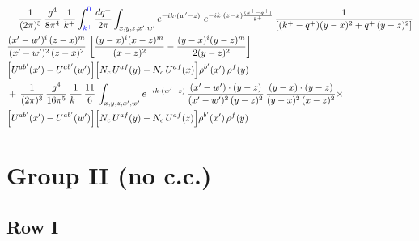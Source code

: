 \documentclass[10pt]{article}
\numberwithin{equation}{section}
\newcommand{\new}[1]{{\color{blue}#1}}
\begin{document}
\begin{align}
& - \frac{1}{(2\pi)^{3}}\,\frac{g^{4}}{8\pi^{4}}\,\frac{1}{k^{+}}\int_{\new{k^{+}}}^{\new{0}}\frac{dq^{+}}{2\pi}\int_{x,y,z,x',w'}e^{-ik\cdot(w'-z)}\ e^{-ik\cdot(z-x)\frac{(k^{+}-q^{+})}{k^{+}}}\,\frac{1}{\left[(k^{+}-q^{+})(y-x)^{2}+q^{+}\,(y-z)^{2}\right]}\notag \\ & \frac{(x'-w')^{i}\,(z-x)^{m}}{(x'-w')^{2}\,(z-x)^{2}}\,\left[\frac{(y-x)^{i}(x-z)^{m}}{(x-z)^{2}}-\frac{(y-x)^{i}(y-z)^{m}}{2(y-z)^{2}}\right]\notag \\ & \Big[U^{ab'}(x')-U^{ab'}(w')\Big]\Big[N_{c}\,U^{af}(y)-N_{c}\,U^{af}(x)\Big]\rho^{b'}(x')\,\rho^{f}(y) \notag \\
& +\, \frac{1}{(2\pi)^{3}}\,\frac{g^{4}}{16\pi^{5}}\,\frac{1}{k^{+}}\,\frac{11}{6}\,\int_{x,y,z,x',w'}e^{-ik\cdot(w'-z)}\, \frac{(x'-w')\cdot(y-z)}{(x'-w')^{2}\,(y-z)^{2}}\,\frac{(y-x)\cdot(y-z)}{(y-x)^{2}\,(x-z)^{2}}\times\notag \\ & \Big[U^{ab'}(x')-U^{ab'}(w')\Big]\Big[N_{c}\,U^{af}(y)-N_{c}\,U^{af}(z)\Big]\rho^{b'}(x')\,\rho^{f}(y) \label{eq:F:G1V2bfin}
\end{align}

\section{Group II (no c.c.)}\label{sec:FgII}
\subsection{Row I}
\end{document}
